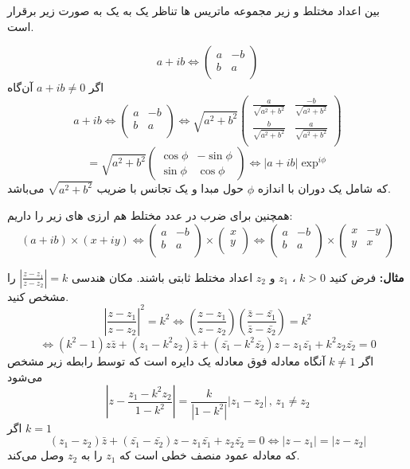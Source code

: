 \documentclass[12pt]{report}
\begin{document}
	بین اعداد مختلط و زیر مجموعه ماتریس ها تناظر یک به یک به صورت زیر برقرار است.
	
	\[
	a + ib \Leftrightarrow \begin{pmatrix}
		a & -b \\
		b & a \\
		
	\end{pmatrix}
	\]
	اگر 
	$a + ib \neq 0$
	آن‌گاه	
	\[
	a + ib \Leftrightarrow \begin{pmatrix}
		a & -b \\
		b & a \\
		
	\end{pmatrix} \Leftrightarrow
	\sqrt{a^2+b^2} \begin{pmatrix}
		\frac{a}{\sqrt{a^2+b^2}} & \frac{-b}{\sqrt{a^2+b^2}} \\
		\frac{b}{\sqrt{a^2+b^2}} & \frac{a}{\sqrt{a^2+b^2}} \\
	\end{pmatrix}
	\]
	\[
	= \sqrt{a^2+b^2} \begin{pmatrix}
		\cos \phi & -\sin \phi \\
		\sin \phi & \cos \phi 
	\end{pmatrix} \Leftrightarrow |a + ib| \exp^{i \phi}
	\]
	که شامل یک دوران با اندازه 
	$\phi$
	حول مبدا و یک تجانس با ضریب
	$\sqrt{a^2+b^2}$
	می‌باشد.
	
	همچنین برای ضرب در عدد مختلط هم ارزی های زیر را داریم:
	\[
	(a+ib) \times (x + iy) \Leftrightarrow \begin{pmatrix}
		a & -b\\
		b & a\\
	\end{pmatrix} \times \begin{pmatrix}
	x \\
	y\\
\end{pmatrix} \Leftrightarrow\begin{pmatrix}
a & -b\\
b & a\\
\end{pmatrix} \times \begin{pmatrix}
x & -y\\
y & x \\
\end{pmatrix}
	\]
	
	\textbf{مثال:}
	فرض کنید
	$k>0$
	،
	$z_1$
	و
	$z_2$
	اعداد مختلط ثابتی باشند. مکان هندسی
	$|\frac{z - z_1}{z - z_2}| = k$
	را مشخص کنید.
	\[
	|\frac{z - z_1}{z - z_2}|^2 = k^2 \Leftrightarrow (\frac{z-z_1}{z- z_2})(\frac{\bar{z} - \bar{z_1}}{\bar{z} - \bar{z_2}} ) = k^2
	\]
	\[
	\Leftrightarrow (k^2 - 1)z\bar{z} + (z_1 - k^2 z_2)\bar{z} + (\bar{z_1}- k^2 \bar{z_2})z - z_1 \bar{z_1} + k^2 z_2 \bar{z_2}= 0
	\]
	اگر 
	$k \neq 1$
	آنگاه معادله فوق معادله یک دایره است که توسط رابطه زیر مشخص می‌شود
	\[
	|z -\frac{z_1 - k^2z_2}{1 - k^2}| = \frac{k}{|1 - k^2|} |z_1 - z_2| \,,\, z_1 \neq z_2
	\]
	اگر 
	$k = 1$
	\[
	(z_1 - z_2)\bar{z} + (\bar{z_1} - \bar{z_2}) z - z_1\bar{z_1} + z_2\bar{z_2} = 0 \Leftrightarrow |z-z_1| = |z-z_2|
	\]
	که معادله عمود منصف خطی است که 
	$z_1$
	را به 
	$z_2$
	وصل می‌کند.
	
\end{document}
